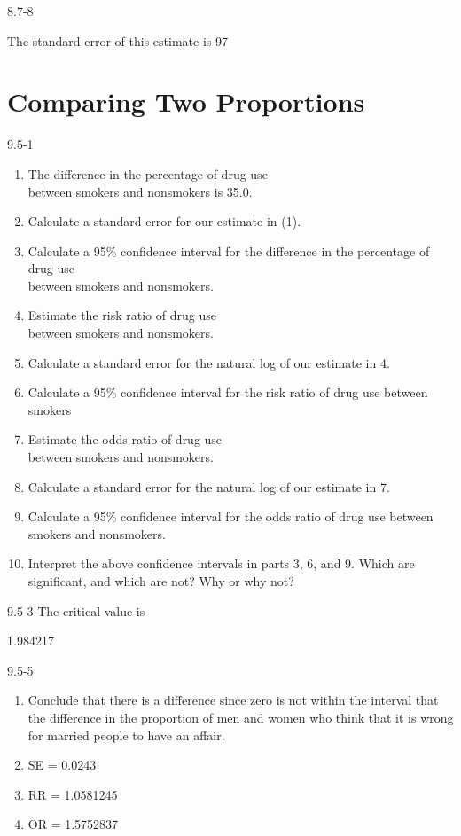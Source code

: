 \begin{exsol@solution}{8.7-8}

The standard error of this estimate is 97

\end{exsol@solution}
\setcounter{chapter}{9}\chapter{Comparing Two Proportions }
\begin{exsol@solution}{9.5-1}


\begin{enumerate}
\item The difference in the percentage of drug use \\ between smokers and nonsmokers is 35.0.
\item Calculate a standard error for our estimate in (1).
\item Calculate a 95\% confidence interval for the difference in the percentage of drug use \\ between smokers and nonsmokers.
\item Estimate the risk ratio of drug use \\ between smokers and nonsmokers.
\item Calculate a standard error for the natural log of our estimate in 4.
\item Calculate a 95\% confidence interval for the risk ratio of drug use between smokers
\item Estimate the odds ratio of drug use \\ between smokers and nonsmokers.
\item Calculate a standard error for the natural log of our estimate in 7.
\item Calculate a 95\% confidence interval for the odds ratio of drug use between smokers and nonsmokers.
\item Interpret the above confidence intervals in parts 3, 6, and 9. Which are significant, and which are not? Why or why not?
\end{enumerate}

\end{exsol@solution}
\begin{exsol@solution}{9.5-3}
   The critical value is


  1.984217

\end{exsol@solution}
\begin{exsol@solution}{9.5-5}
	

	
	  \begin{enumerate}
	  \item Conclude that there is a difference since zero is not within the interval that the difference in the proportion of men and women who think that it is wrong for married people to have an affair.
	  \item SE = 0.0243
	  \item RR = 1.0581245
	  \item OR = 1.5752837
	  \end{enumerate}	
	
\end{exsol@solution}
